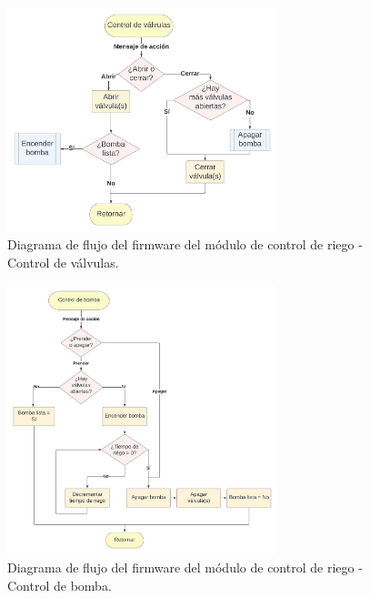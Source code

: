 \begin{figure}[!h]
	\centering
	\includegraphics[width=0.7\textwidth]{./Figures/chapter3/FirmwareValveControl.jpg}
	\caption[Diagrama de flujo del firmware del módulo de control de riego - Control de válvulas]{Diagrama de flujo del firmware del módulo de control de riego - Control de válvulas.}
	\label{fig:flow_valvecontrol}
\end{figure}

\begin{figure}[!h]
	\centering
	\includegraphics[width=0.7\textwidth]{./Figures/chapter3/FirmwarePumpControl.jpg}
	\caption[Diagrama de flujo del firmware del módulo de control de riego - Control de bomba]{Diagrama de flujo del firmware del módulo de control de riego - Control de bomba.}
	\label{fig:flow_bombacontrol}
\end{figure}







